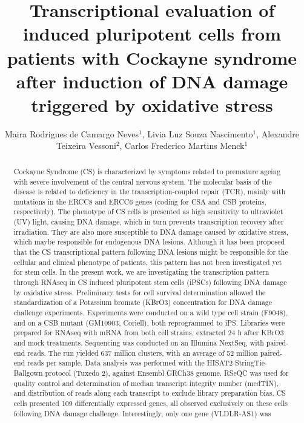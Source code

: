 \documentclass[twoside]{article}
\title{\vspace{-15mm}\fontsize{24pt}{10pt}\selectfont\textbf{Transcriptional evaluation of induced pluripotent cells from patients with Cockayne syndrome after induction of DNA damage triggered by oxidative stress}} %
\author{Maira Rodrigues de Camargo Neves$^1$, Livia Luz Souza Nascimento$^1$, Alexandre Teixeira Vessoni$^2$, Carlos Frederico Martins Menck$^1$}
\affil{1 DEPARTMENT OF MICROBIOLOGY, INSTITUTE OF BIOMEDICAL SCIENCES, USP\\ 2 DEPARTMENT OF MEDICINE, WASHINGTON UNIVERSITY IN SAINT LOUIS\\ }
\date{}
\begin{document}
\maketitle %

\thispagestyle{fancy} %


\begin{abstract}
Cockayne Syndrome (CS) is characterized by symptoms related to premature ageing with
severe involvement of the central nervous system. The molecular basis of the disease is related
to deficiency in the transcription-coupled repair (TCR), mainly with mutations in the ERCC8 and
ERCC6 genes (coding for CSA and CSB proteins, respectively). The phenotype of CS cells is
presented as high sensitivity to ultraviolet (UV) light, causing DNA damage, which in turn
prevents transcription recovery after irradiation. They are also more susceptible to DNA
damage caused by oxidative stress, which maybe responsible for endogenous DNA lesions.
Although it has been proposed that the CS transcriptional pattern following DNA lesions might
be responsible for the cellular and clinical phenotype of patients, this pattern has not been
investigated yet for stem cells. In the present work, we are investigating the transcription
pattern through RNAseq in CS induced pluripotent stem cells (iPSCs) following DNA damage by
oxidative stress. Preliminary tests for cell survival determination allowed the standardization of
a Potassium bromate (KBrO3) concentration for DNA damage challenge experiments.
Experiments were conducted on a wild type cell strain (F9048), and on a CSB mutant
(GM10903, Coriell), both reprogrammed to iPS. Libraries were prepared for RNAseq with
mRNA from both cell strains, extracted 24 h after KBrO3 and mock treatments. Sequencing
was conducted on an Illumina NextSeq, with paired-end reads. The run yielded 637 million
clusters, with an average of 52 million paired-end reads per sample. Data analysis was
performed with the HISAT2-StringTie-Ballgown protocol (Tuxedo 2), against Ensembl GRCh38
genome. RSeQC was used for quality control and determination of median transcript integrity
number (medTIN), and distribution of reads along each transcript to exclude library
preparation bias. CS cells presented 109 differentially expressed genes, all observed exclusively
on these cells following DNA damage challenge. Interestingly, only one gene (VLDLR-AS1) was

\end{abstract}
\end{document}
